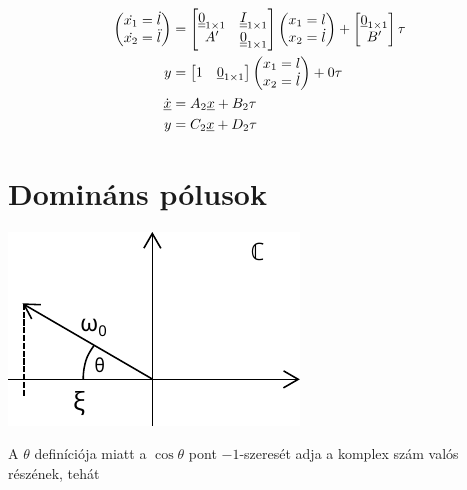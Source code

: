 \documentclass{article}
\begin{document}
        \begin{align}
			\begin{pmatrix}
				\dot{x_1} = \dot{l} \\
				\dot{x_2} = \ddot{l}
			\end{pmatrix}
			& =
			\begin{bmatrix}
				\underline{\underline{0}}_{1 \times 1} & \underline{\underline{I}}_{1 \times 1} \\
				A' & \underline{\underline{0}}_{1 \times 1}
			\end{bmatrix}
			\begin{pmatrix}
				x_1 = l \\
				x_2 = \dot{l}
			\end{pmatrix}
			+
			\begin{bmatrix}
				\underline{0}_{1 \times 1} \\
				B'
			\end{bmatrix}
			\tau \\
			y & =
			\begin{bmatrix}
				1 & \underline{0}_{1 \times 1} 
			\end{bmatrix}
			\begin{pmatrix}
				x_1 = l \\
				x_2 = \dot{l}
			\end{pmatrix}
			+
			0\tau \\
			\dot{\underline{x}} & = A_2 \underline{x} + B_2 \tau \\
			y & = C_2 \underline{x} + D_2\tau
		\end{align}
\section{Domináns pólusok}
	\newcommand{\sdom}{s_{\textrm{dominant}}}
	\newcommand{\sdoms}{s_{\textrm{dominant}_{1,2}}}
	\newcommand{\re}[1]{\Re\{#1\}}
	\newcommand{\im}[1]{\Im\{#1\}}

	\begin{center}
		\includegraphics{asset/dominant.pdf}
	\end{center}

	A $\theta$ definíciója miatt a $\cos{\theta}$ pont $-1$-szeresét adja a komplex szám valós részének, tehát
\end{document}
